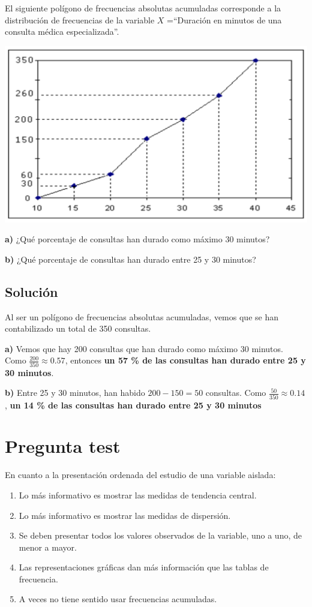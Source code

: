 \documentclass[
]{book}
\providecommand{\tightlist}{%
  \setlength{\itemsep}{0pt}\setlength{\parskip}{0pt}}
\begin{document}
El siguiente polígono de frecuencias absolutas acumuladas corresponde a la distribución de frecuencias de la variable \(X\) =``Duración en minutos de una consulta médica especializada''.

\includegraphics[width=19.47in]{img/2_1}

\textbf{a)} ¿Qué porcentaje de consultas han durado como máximo 30 minutos?

\textbf{b)} ¿Qué porcentaje de consultas han durado entre 25 y 30 minutos?

\hypertarget{soluciuxf3n-4}{%
\subsection{Solución}\label{soluciuxf3n-4}}

Al ser un polígono de frecuencias absolutas acumuladas, vemos que se han contabilizado un total de 350 consultas.

\textbf{a)} Vemos que hay 200 consultas que han durado como máximo 30 minutos. Como \(\frac{200}{350} \approx 0.57\), entonces \textbf{un 57 \% de las consultas han durado entre 25 y 30 minutos}.

\textbf{b)} Entre 25 y 30 minutos, han habido \(200 - 150 = 50\) consultas. Como \(\frac{50}{350} \approx 0.14\), \textbf{un 14 \% de las consultas han durado entre 25 y 30 minutos}

\hypertarget{pregunta-test-26}{%
\section{Pregunta test}\label{pregunta-test-26}}

En cuanto a la presentación ordenada del estudio de una variable aislada:

\begin{enumerate}
\def\labelenumi{\alph{enumi})}
\tightlist
\item
  Lo más informativo es mostrar las medidas de tendencia central.
\item
  Lo más informativo es mostrar las medidas de dispersión.
\item
  Se deben presentar todos los valores observados de la variable, uno a uno, de menor a mayor.
\item
  Las representaciones gráficas dan más información que las tablas de frecuencia.
\item
  A veces no tiene sentido usar frecuencias acumuladas.
\end{enumerate}
\end{document}
